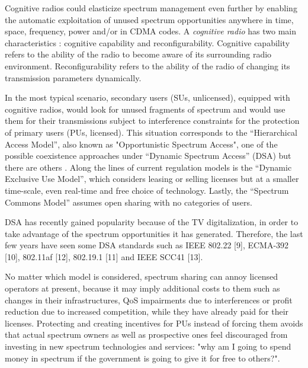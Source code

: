 Cognitive radios \cite{ref:Mitola1999} could elasticize spectrum management even further by enabling the automatic exploitation of unused spectrum opportunities anywhere in time, space, frequency, power and/or in CDMA codes.
A \emph{cognitive radio} has two main characteristics \cite{ref:Akyildiz2006}: cognitive capability and reconfigurability. 
Cognitive capability refers to the ability of the radio to become aware of its surrounding radio environment. Reconfigurability refers to the ability of the radio of changing its transmission parameters dynamically.

In the most typical scenario, secondary users (SUs, unlicensed), equipped with cognitive radios, would look for unused fragments of spectrum and would use them for their transmissions subject to interference constraints for the protection of primary users (PUs, licensed). 
This situation corresponds to the “Hierarchical Access Model”, also known as "Opportunistic Spectrum Access", one of the possible coexistence approaches under “Dynamic Spectrum Access” (DSA) but there are others \cite{ref:Zhao2007_sur}. 
Along the lines of current regulation models is the “Dynamic Exclusive Use Model”, which considers leasing or selling licenses but at a smaller time-scale, even real-time and free choice of technology.
Lastly, the “Spectrum Commons Model”  assumes open sharing with no categories of users.

DSA has recently gained popularity because of the TV digitalization, in order to take advantage of the spectrum opportunities it has generated. %
Therefore, the last few years have seen some DSA standards such as IEEE 802.22 [9], ECMA-392 [10], 802.11af [12], 802.19.1 [11] and IEEE SCC41 [13].

No matter which model is considered, spectrum sharing can annoy licensed operators at present, because it may imply additional costs to them such as changes in their infrastructures, QoS impairments due to interferences or profit reduction due to increased competition, while they have already paid for their licenses. 
Protecting and creating incentives for PUs instead of forcing them avoids that actual spectrum owners as well as prospective ones feel discouraged from investing in new spectrum technologies and services: "why am I going to spend money in spectrum if the government is going to give it for free to others?".

